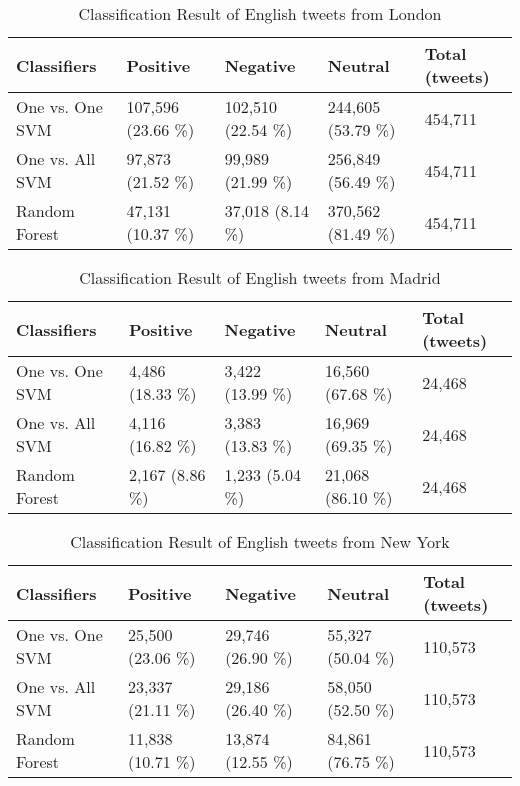 \begin{table}[ht]
	\caption{Classification Result of English tweets from London}
	\begin{tabular}{|l|p{1.8cm}|p{1.8cm}|p{1.8cm}|p{1.8cm}|} \hline
	Classifiers & Positive & Negative & Neutral & Total (tweets)\\ \hline
One vs. One SVM & 107,596 (23.66 \%) & 102,510 (22.54 \%) & 244,605 (53.79 \%)& 454,711 \\ \hline
One vs. All SVM & 97,873 (21.52 \%) & 99,989 (21.99 \%) & 256,849 (56.49 \%)& 454,711 \\ \hline
Random Forest   & 47,131 (10.37 \%)  & 37,018 (8.14 \%)  & 370,562 (81.49 \%) & 454,711 \\ \hline
	\end{tabular}
	\label{tab:result_london_en}
\end{table}

\begin{table}[ht]
	\caption{Classification Result of English tweets from Madrid}
	\begin{tabular}{|l|p{1.8cm}|p{1.8cm}|p{1.8cm}|p{1.8cm}|} \hline
	Classifiers & Positive & Negative & Neutral & Total (tweets)\\ \hline
One vs. One SVM & 4,486 (18.33 \%) & 3,422 (13.99 \%)& 16,560 (67.68 \%)& 24,468 \\ \hline
One vs. All SVM & 4,116 (16.82 \%)& 3,383 (13.83 \%)& 16,969 (69.35 \%)& 24,468 \\ \hline
Random Forest   & 2,167 (8.86 \%)& 1,233 (5.04 \%)& 21,068 (86.10 \%)& 24,468 \\ \hline
	\end{tabular}
	\label{tab:result_madrid_en}
\end{table}

\begin{table}[ht]
	\caption{Classification Result of English tweets from New York}
	\begin{tabular}{|l|p{1.8cm}|p{1.8cm}|p{1.8cm}|p{1.8cm}|} \hline

	Classifiers & Positive & Negative & Neutral & Total (tweets)\\ \hline
One vs. One SVM & 25,500 (23.06 \%) & 29,746 (26.90 \%)& 55,327 (50.04 \%)& 110,573 \\ \hline
One vs. All SVM & 23,337 (21.11 \%)& 29,186 (26.40 \%)& 58,050 (52.50 \%)& 110,573 \\ \hline
Random Forest   & 11,838 (10.71 \%)& 13,874 (12.55 \%)& 84,861 (76.75 \%)& 110,573 \\ \hline
	\end{tabular}
	\label{tab:result_newyork_en}
\end{table}

